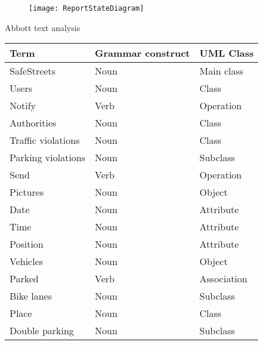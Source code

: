 \begin{figure}[H]
	\centering
	\texttt{[image: ReportStateDiagram]}
\end{figure}



Abbott text analysis
 
 
\setlength{\arrayrulewidth}{1mm}
\setlength{\tabcolsep}{18pt}
\renewcommand{\arraystretch}{2}
 
{
\begin{tabular}{ |p{4cm}|p{4cm}|p{4cm}|  }
\hline
Term & Grammar construct & UML Class \\[0.1cm]
\hline
SafeStreets & Noun & Main class \\
Users & Noun & Class \\
Notify & Verb   & Operation \\
Authorities & Noun & Class \\
Traffic violations & Noun & Class \\
Parking violations & Noun & Subclass \\
Send & Verb &  Operation  \\
Pictures & Noun & Object \\
Date & Noun & Attribute \\
Time & Noun & Attribute \\
Position & Noun & Attribute \\
Vehicles & Noun & Object \\
Parked & Verb & Association \\
Bike lanes & Noun & Subclass \\
Place & Noun & Class \\
Double parking & Noun & Subclass \\
\hline
\end{tabular}
}